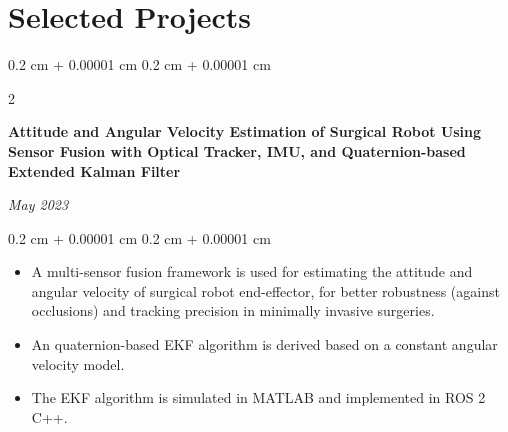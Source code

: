 \documentclass[10pt, letterpaper]{article}
\newenvironment{highlights}{
    \begin{itemize}[
        topsep=0.10 cm,
        parsep=0.10 cm,
        partopsep=0pt,
        itemsep=0pt,
        leftmargin=0.4 cm + 10pt
    ]
}{
    \end{itemize}
} %
\newenvironment{onecolentry}{
    \begin{adjustwidth}{
        0.2 cm + 0.00001 cm
    }{
        0.2 cm + 0.00001 cm
    }
}{
    \end{adjustwidth}
} %
\newenvironment{twocolentry}[2][]{
    \onecolentry
    \def\secondColumn{#2}
    \setcolumnwidth{\fill, 4.5 cm}
    \begin{paracol}{2}
}{
    \switchcolumn \raggedleft \secondColumn
    \end{paracol}
    \endonecolentry
} %
\let\hrefWithoutArrow\href
\renewcommand{\href}[2]{\hrefWithoutArrow{#1}{\ifthenelse{\equal{#2}{}}{ }{#2 }\raisebox{.15ex}{\footnotesize \faExternalLink*}}}
\begin{document}






    \section{Selected Projects}

        \begin{twocolentry}{
        \textit{May 2023}}
            \textbf{Attitude and Angular Velocity Estimation of Surgical Robot Using Sensor Fusion with Optical Tracker, IMU, and Quaternion-based Extended Kalman Filter}
        \end{twocolentry}
        \vspace{0.10 cm}
        \begin{onecolentry}
            \begin{highlights}
                \item A multi-sensor fusion framework is used for estimating the attitude and angular velocity of surgical robot end-effector, for better robustness (against occlusions) and tracking precision in minimally invasive surgeries.
                \item An quaternion-based EKF algorithm is derived based on a constant angular velocity model.
                \item The EKF algorithm is simulated in MATLAB and implemented in ROS 2 C++.
            \end{highlights}
        \end{onecolentry}

        \vspace{0.2 cm}
\end{document}
